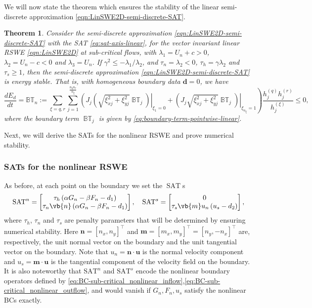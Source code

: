 \documentclass{article}
\numberwithin{equation}{section}
\newtheorem{theorem}{Theorem}
\theoremstyle{definition}
\begin{document}
We will now state the theorem which ensures the stability of the linear semi-discrete approximation \eqref{eqn:LinSWE2D-semi-discrete-SAT}.
\begin{theorem}
    Consider the semi-discrete approximation  \eqref{eqn:LinSWE2D-semi-discrete-SAT} with the SAT \eqref{eq:sat-axis-linear}, for the vector invariant  linear RSWE \eqref{eqn:LinSWE2D} 
    at sub-critical flows, with $\lambda_1 = U_n + c >0$, $\lambda_2 = U_n-c < 0$ and $\lambda_3 = U_n$. If $\gamma^2 \le -\lambda_1/\lambda_2$, and $\tau_n =\lambda_2 < 0$, $\tau_h = \gamma \lambda_2$ and $\tau_s \ge 1$,  then the semi-discrete approximation  \eqref{eqn:LinSWE2D-semi-discrete-SAT} is energy stable. That is, with homogeneous boundary data $\bm{d}=0$, we have
    $$
    \frac{dE_d}{dt} = \mathbb{BT}_n:= \sum_{\xi = q, r}\sum_{j=1}^{\frac{n_qn_r}{n_\xi}} \left.\left(J_j\left(\sqrt{\xi_{xj}^2 + \xi_{yj}^2}\operatorname{\mathbb{BT}}_j\right)\right|_{\xi_{1} = 0} + \left.\left(J_j\sqrt{\xi_{xj}^2 + \xi_{yj}^2}\operatorname{\mathbb{BT}}_j\right)\right|_{\xi_{n_\xi} = 1}\right) \frac{h_j^{(q)}h_j^{(r)}}{h_j^{(\xi)}}\le 0,
    $$
    where the boundary term $\operatorname{\mathbb{BT}}_j$ is given by \eqref{eq:boundary-term-pointwise-linear}.
\end{theorem} 
Next, we will derive the SATs for the nonlinear RSWE and prove numerical stability.
\subsubsection{SATs for the nonlinear RSWE}
As before, at each point on the boundary we set the $\operatorname{SAT}$s
%
\begin{equation}\label{eq:sat-non-linear}
%
\mathrm{SAT}^{n} =
\begin{bmatrix}
    \tau_h\left(\alpha G_n - \beta F_n- d_1\right)\\
     \tau_n\vb{n}\left(\alpha G_n - \beta F_n- d_1\right)
\end{bmatrix},
\quad
\mathrm{SAT}^{s} = 
\begin{bmatrix}
    0\\
     \tau_s\vb{m}u_n\left(u_s- d_2\right)
\end{bmatrix},
\end{equation}
where $\tau_h$, $\tau_n$ and $\tau_s$ are penalty parameters that will be determined by ensuring numerical stability. Here $\bm{n} = [n_x, n_y]^\top$  and  $\bm{m} = [m_x, m_y]^\top = [n_y, -n_x]^\top$ are, respectively, the unit normal vector on the boundary and the  unit tangential vector on the boundary. Note that $u_n =\bm{n}\cdot \bm{u} $ is the normal velocity component and  $u_s = \bm{m}\cdot \bm{u}$ is the tangential component of the velocity field on the boundary. It is also noteworthy that $\mathrm{SAT}^{n}$ and $\mathrm{SAT}^{s}$ encode the nonlinear boundary operators defined by \eqref{eq:BC-sub-critical_nonlinear_inflow},\eqref{eq:BC-sub-critical_nonlinear_outflow}, and would vanish if $G_n, F_n, u_s$ satisfy the nonlinear BCs exactly.
\end{document}

